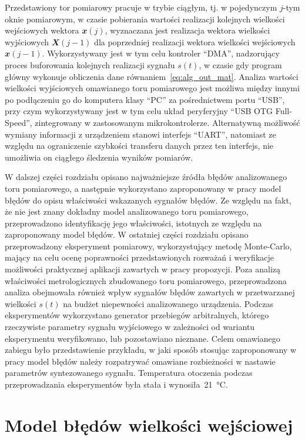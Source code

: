 Przedstawiony tor pomiarowy pracuje w trybie ciągłym, tj. w pojedynczym $j$-tym oknie pomiarowym, w czasie pobierania wartości realizacji kolejnych wielkości wejściowych wektora $\mathbfit{x}(j)$, wyznaczana jest realizacja wektora wielkości wyjściowych $\mathbfit{X}(j-1)$ dla poprzedniej realizacji wektora wielkości wejściowych $\mathbfit{x}(j-1)$. Wykorzystywany jest w tym celu kontroler \enquote{DMA}, nadzorujący proces buforowania kolejnych realizacji sygnału $s(t)$, w czasie gdy program główny wykonuje obliczenia dane równaniem~\eqref{eq:alg_out_mat}. Analiza wartości wielkości wyjściowych omawianego toru pomiarowego jest możliwa między innymi po podłączeniu go do komputera klasy \enquote{PC} za pośrednictwem portu \enquote{USB}, przy czym wykorzystywany jest w tym celu układ peryferyjny \enquote{USB OTG Full-Speed}, zintegrowany w zastosowanym mikrokontrolerze. Alternatywną możliwość wymiany informacji z urządzeniem stanowi interfejs \enquote{UART}, natomiast ze względu na ograniczenie szybkości transferu danych przez ten interfejs, nie umożliwia on ciągłego śledzenia wyników pomiarów.

W dalszej części rozdziału opisano najważniejsze źródła błędów analizowanego toru pomiarowego, a następnie wykorzystano zaproponowany w pracy model błędów do opisu właściwości wskazanych sygnałów błędów. Ze względu na fakt, że nie jest znany dokładny model analizowanego toru pomiarowego, przeprowadzono identyfikację jego właściwości, istotnych ze względu na zaproponowany model błędów. W ostatniej części rozdziału opisano przeprowadzony eksperyment pomiarowy, wykorzystujący metodę Monte-Carlo, mający na celu ocenę poprawności przedstawionych rozważań i weryfikacje możliwości praktycznej aplikacji zawartych w pracy propozycji. Poza analizą właściwości metrologicznych zbudowanego toru pomiarowego, przeprowadzona analiza obejmowała również wpływ sygnałów błędów zawartych w przetwarzanej wielkości $s(t)$ na budżet niepewności analizowanego urządzenia. Podczas eksperymentów wykorzystano generator przebiegów arbitralnych, którego rzeczywiste parametry sygnału wyjściowego w zależności od wariantu eksperymentu weryfikowano, lub pozostawiano nieznane. Celem omawianego zabiegu było przedstawienie przykładu, w jaki sposób stosując zaproponowany w pracy model błędów należy rozpatrywać omawiane rozbieżności w nastawie parametrów syntezowanego sygnału. Temperatura otoczenia podczas przeprowadzania eksperymentów była stała i wynosiła~\qty{21}{\degreeCelsius}.

\section{Model błędów wielkości wejściowej}

